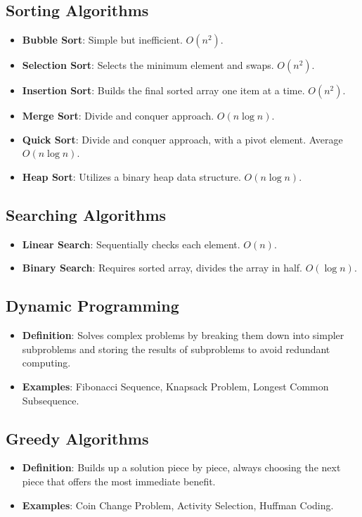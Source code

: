 \documentclass{article}
\begin{document}
\subsection{Sorting Algorithms}
\begin{itemize}
    \item \textbf{Bubble Sort}: Simple but inefficient. $O(n^2)$.
    \item \textbf{Selection Sort}: Selects the minimum element and swaps. $O(n^2)$.
    \item \textbf{Insertion Sort}: Builds the final sorted array one item at a time. $O(n^2)$.
    \item \textbf{Merge Sort}: Divide and conquer approach. $O(n \log n)$.
    \item \textbf{Quick Sort}: Divide and conquer approach, with a pivot element. Average $O(n \log n)$.
    \item \textbf{Heap Sort}: Utilizes a binary heap data structure. $O(n \log n)$.
\end{itemize}

\subsection{Searching Algorithms}
\begin{itemize}
    \item \textbf{Linear Search}: Sequentially checks each element. $O(n)$.
    \item \textbf{Binary Search}: Requires sorted array, divides the array in half. $O(\log n)$.
\end{itemize}

\subsection{Dynamic Programming}
\begin{itemize}
    \item \textbf{Definition}: Solves complex problems by breaking them down into simpler subproblems and storing the results of subproblems to avoid redundant computing.
    \item \textbf{Examples}: Fibonacci Sequence, Knapsack Problem, Longest Common Subsequence.
\end{itemize}

\subsection{Greedy Algorithms}
\begin{itemize}
    \item \textbf{Definition}: Builds up a solution piece by piece, always choosing the next piece that offers the most immediate benefit.
    \item \textbf{Examples}: Coin Change Problem, Activity Selection, Huffman Coding.
\end{itemize}
\end{document}
